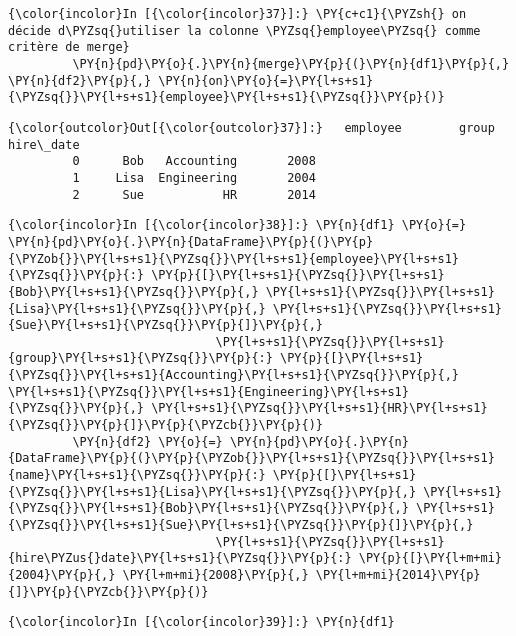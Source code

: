     \begin{Verbatim}[commandchars=\\\{\}]
{\color{incolor}In [{\color{incolor}37}]:} \PY{c+c1}{\PYZsh{} on décide d\PYZsq{}utiliser la colonne \PYZsq{}employee\PYZsq{} comme critère de merge}
         \PY{n}{pd}\PY{o}{.}\PY{n}{merge}\PY{p}{(}\PY{n}{df1}\PY{p}{,} \PY{n}{df2}\PY{p}{,} \PY{n}{on}\PY{o}{=}\PY{l+s+s1}{\PYZsq{}}\PY{l+s+s1}{employee}\PY{l+s+s1}{\PYZsq{}}\PY{p}{)}
\end{Verbatim}


\begin{Verbatim}[commandchars=\\\{\}]
{\color{outcolor}Out[{\color{outcolor}37}]:}   employee        group  hire\_date
         0      Bob   Accounting       2008
         1     Lisa  Engineering       2004
         2      Sue           HR       2014
\end{Verbatim}
            
    \begin{Verbatim}[commandchars=\\\{\}]
{\color{incolor}In [{\color{incolor}38}]:} \PY{n}{df1} \PY{o}{=} \PY{n}{pd}\PY{o}{.}\PY{n}{DataFrame}\PY{p}{(}\PY{p}{\PYZob{}}\PY{l+s+s1}{\PYZsq{}}\PY{l+s+s1}{employee}\PY{l+s+s1}{\PYZsq{}}\PY{p}{:} \PY{p}{[}\PY{l+s+s1}{\PYZsq{}}\PY{l+s+s1}{Bob}\PY{l+s+s1}{\PYZsq{}}\PY{p}{,} \PY{l+s+s1}{\PYZsq{}}\PY{l+s+s1}{Lisa}\PY{l+s+s1}{\PYZsq{}}\PY{p}{,} \PY{l+s+s1}{\PYZsq{}}\PY{l+s+s1}{Sue}\PY{l+s+s1}{\PYZsq{}}\PY{p}{]}\PY{p}{,}
                             \PY{l+s+s1}{\PYZsq{}}\PY{l+s+s1}{group}\PY{l+s+s1}{\PYZsq{}}\PY{p}{:} \PY{p}{[}\PY{l+s+s1}{\PYZsq{}}\PY{l+s+s1}{Accounting}\PY{l+s+s1}{\PYZsq{}}\PY{p}{,} \PY{l+s+s1}{\PYZsq{}}\PY{l+s+s1}{Engineering}\PY{l+s+s1}{\PYZsq{}}\PY{p}{,} \PY{l+s+s1}{\PYZsq{}}\PY{l+s+s1}{HR}\PY{l+s+s1}{\PYZsq{}}\PY{p}{]}\PY{p}{\PYZcb{}}\PY{p}{)}
         \PY{n}{df2} \PY{o}{=} \PY{n}{pd}\PY{o}{.}\PY{n}{DataFrame}\PY{p}{(}\PY{p}{\PYZob{}}\PY{l+s+s1}{\PYZsq{}}\PY{l+s+s1}{name}\PY{l+s+s1}{\PYZsq{}}\PY{p}{:} \PY{p}{[}\PY{l+s+s1}{\PYZsq{}}\PY{l+s+s1}{Lisa}\PY{l+s+s1}{\PYZsq{}}\PY{p}{,} \PY{l+s+s1}{\PYZsq{}}\PY{l+s+s1}{Bob}\PY{l+s+s1}{\PYZsq{}}\PY{p}{,} \PY{l+s+s1}{\PYZsq{}}\PY{l+s+s1}{Sue}\PY{l+s+s1}{\PYZsq{}}\PY{p}{]}\PY{p}{,}
                             \PY{l+s+s1}{\PYZsq{}}\PY{l+s+s1}{hire\PYZus{}date}\PY{l+s+s1}{\PYZsq{}}\PY{p}{:} \PY{p}{[}\PY{l+m+mi}{2004}\PY{p}{,} \PY{l+m+mi}{2008}\PY{p}{,} \PY{l+m+mi}{2014}\PY{p}{]}\PY{p}{\PYZcb{}}\PY{p}{)}
\end{Verbatim}


    \begin{Verbatim}[commandchars=\\\{\}]
{\color{incolor}In [{\color{incolor}39}]:} \PY{n}{df1}
\end{Verbatim}


